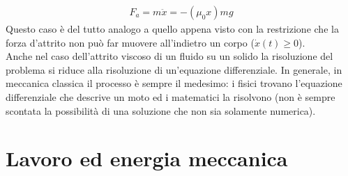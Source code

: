 \documentclass[10pt,a4paper]{article}
\begin{document}
\begin{align*}
	F_a = m \ddot{x} = -(\mu_0 x)mg
\end{align*}
Questo caso è del tutto analogo a quello appena visto con la restrizione che la forza d'attrito non può far muovere all'indietro un corpo ($\dot{x}(t)\geq 0$).\\
Anche nel caso dell'attrito viscoso di un fluido su un solido la risoluzione del problema si riduce alla risoluzione di un'equazione differenziale. In generale, in meccanica classica il processo è sempre il medesimo: i fisici trovano l'equazione differenziale che descrive un moto ed i matematici la risolvono (non è sempre scontata la possibilità di una soluzione che non sia solamente numerica). 
\section{Lavoro ed energia meccanica}
\end{document}
